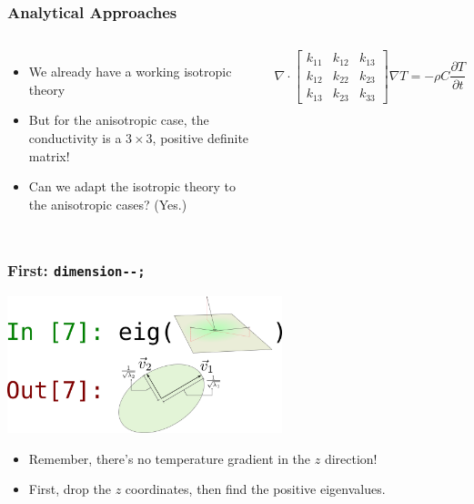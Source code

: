 \documentclass{beamer}
\begin{document}
\begin{frame}
\frametitle{Analytical Approaches}
\begin{columns}[c]
    \begin{itemize}
    \item We already have a working isotropic theory
    \item But for the anisotropic case, the conductivity is a \(3\times 3\), positive definite matrix!
    \item Can we adapt the isotropic theory to the anisotropic cases? (Yes.)
    \end{itemize}
    \begin{equation*}
    \nabla \cdot \begin{bmatrix}
    k_{11} & k_{12} & k_{13}\\
    k_{12} & k_{22} & k_{23}\\
    k_{13} & k_{23} & k_{33}
    \end{bmatrix}\nabla T = -\rho C\frac{\partial T}{\partial t}
    \end{equation*}
\end{columns}
\end{frame}


\begin{frame}
\frametitle{First: \texttt{dimension-}\texttt{-;}}
\centering
\includegraphics[width=0.6\textwidth]{fig/projection.png}
\begin{itemize}
\item Remember, there's no temperature gradient in the \(z\) direction!
\item First, drop the \(z\) coordinates, then find the positive eigenvalues.
\end{itemize}
\end{frame}
\end{document}
